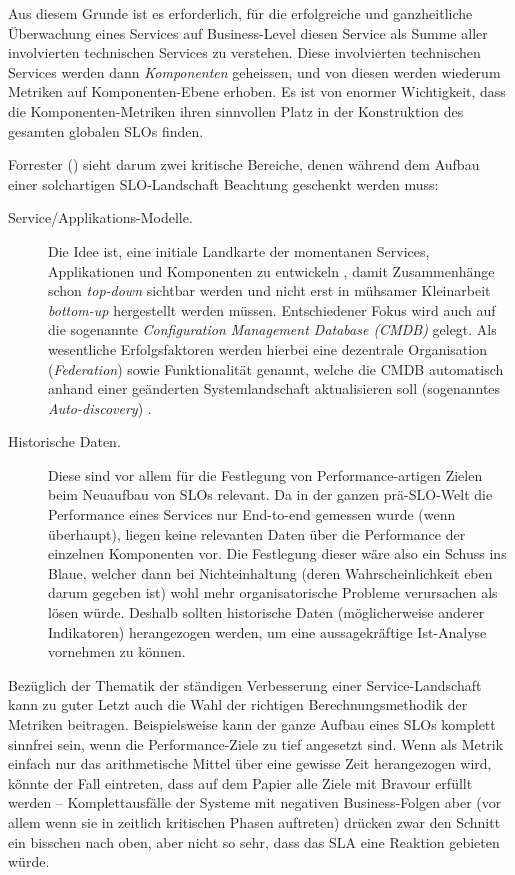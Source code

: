 \documentclass[11pt,listof=totoc]{scrreprt} %
\theoremstyle{definition}
\begin{document}
Aus diesem Grunde ist es erforderlich, für die erfolgreiche und ganzheitliche Überwachung eines Services auf Business-Level diesen Service als Summe aller involvierten technischen Services zu verstehen. Diese involvierten technischen Services werden dann {\em Komponenten} geheissen, und von diesen werden wiederum Metriken auf Komponenten-Ebene erhoben. Es ist von enormer Wichtigkeit, dass die Komponenten-Metriken ihren sinnvollen Platz in der Konstruktion des gesamten globalen SLOs finden.

Forrester (\cite{forrester:slaBestPractices}) sieht darum zwei kritische Bereiche, denen während dem Aufbau einer solchartigen SLO-Landschaft Beachtung geschenkt werden muss:
\begin{description}
\item[Service/Applikations-Modelle.] Die Idee ist, eine initiale Landkarte der momentanen Services, Applikationen und Komponenten zu entwickeln \cite{forrester:slaBestPractices}, damit Zusammenhänge schon {\em top-down} sichtbar werden und nicht erst in mühsamer Kleinarbeit {\em bottom-up} hergestellt werden müssen. Entschiedener Fokus wird auch auf die sogenannte {\em Configuration Management Database (CMDB)} gelegt. Als wesentliche Erfolgsfaktoren werden hierbei eine dezentrale Organisation ({\em Federation}) sowie Funktionalität genannt, welche die CMDB automatisch anhand einer geänderten Systemlandschaft aktualisieren soll (sogenanntes {\em Auto-discovery}) \cite{forrester:implementingBsm}.
\item[Historische Daten.] Diese sind vor allem für die Festlegung von Performance-artigen Zielen beim Neuaufbau von SLOs relevant. Da in der ganzen prä-SLO-Welt die Performance eines Services nur End-to-end gemessen wurde (wenn überhaupt), liegen keine relevanten Daten über die Performance der einzelnen Komponenten vor. Die Festlegung dieser wäre also ein Schuss ins Blaue, welcher dann bei Nichteinhaltung (deren Wahrscheinlichkeit eben darum gegeben ist) wohl mehr organisatorische Probleme verursachen als lösen würde. Deshalb sollten historische Daten (möglicherweise anderer Indikatoren) herangezogen werden, um eine aussagekräftige Ist-Analyse vornehmen zu können.
\end{description}

Bezüglich der Thematik der ständigen Verbesserung einer Service-Landschaft kann zu guter Letzt auch die Wahl der richtigen Berechnungsmethodik der Metriken beitragen. Beispielsweise kann der ganze Aufbau eines SLOs komplett sinnfrei sein, wenn die Performance-Ziele zu tief angesetzt sind. Wenn als Metrik einfach nur das arithmetische Mittel über eine gewisse Zeit herangezogen wird, könnte der Fall eintreten, dass auf dem Papier alle Ziele mit Bravour erfüllt werden -- Komplettausfälle der Systeme mit negativen Business-Folgen aber (vor allem wenn sie in zeitlich kritischen Phasen auftreten) drücken zwar den Schnitt ein bisschen nach oben, aber nicht so sehr, dass das SLA eine Reaktion gebieten würde.
\end{document}
